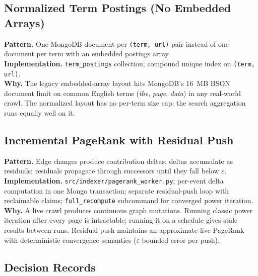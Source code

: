 \documentclass[11pt,a4paper]{article}
\newcommand{\code}[1]{\texttt{#1}}
\begin{document}
\subsection{Normalized Term Postings (No Embedded Arrays)}

\textbf{Pattern.} One MongoDB document per \code{(term, url)} pair instead of one document per term with an embedded postings array.\\
\textbf{Implementation.} \code{term\_postings} collection; compound unique index on \code{(term, url)}.\\
\textbf{Why.} The legacy embedded-array layout hits MongoDB's 16~MB BSON document limit on common English terms (\textit{the}, \textit{page}, \textit{data}) in any real-world crawl. The normalized layout has no per-term size cap; the search aggregation runs equally well on it.

\subsection{Incremental PageRank with Residual Push}

\textbf{Pattern.} Edge changes produce contribution deltas; deltas accumulate as residuals; residuals propagate through successors until they fall below $\varepsilon$.\\
\textbf{Implementation.} \code{src/indexer/pagerank\_worker.py}; per-event delta computation in one Mongo transaction; separate residual-push loop with reclaimable claims; \code{full\_recompute} subcommand for converged power iteration.\\
\textbf{Why.} A live crawl produces continuous graph mutations. Running classic power iteration after every page is intractable; running it on a schedule gives stale results between runs. Residual push maintains an approximate live PageRank with deterministic convergence semantics ($\varepsilon$-bounded error per push).

\subsection{Decision Records}
\end{document}
